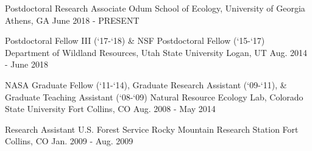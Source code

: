 

\begin{cventries}

  \eduentry
    {Postdoctoral Research Associate} %
    {Odum School of Ecology, University of Georgia} %
    {Athens, GA} %
    {June 2018 - PRESENT} %

  \eduentry
    {Postdoctoral Fellow III (`17-`18) \& NSF Postdoctoral Fellow (`15-`17)} %
    {Department of Wildland Resources, Utah State University} %
    {Logan, UT} %
    {Aug. 2014 - June 2018} %

  \eduentry
    {NASA Graduate Fellow (`11-`14), Graduate Research Assistant (`09-`11), \& Graduate Teaching Assistant (`08-`09)} %
    {Natural Resource Ecology Lab, Colorado State University} %
    {Fort Collins, CO} %
    {Aug. 2008 - May 2014} %

  \eduentry
    {Research Assistant} %
    {U.S. Forest Service Rocky Mountain Research Station} %
    {Fort Collins, CO} %
    {Jan. 2009 - Aug. 2009} %

\end{cventries}
